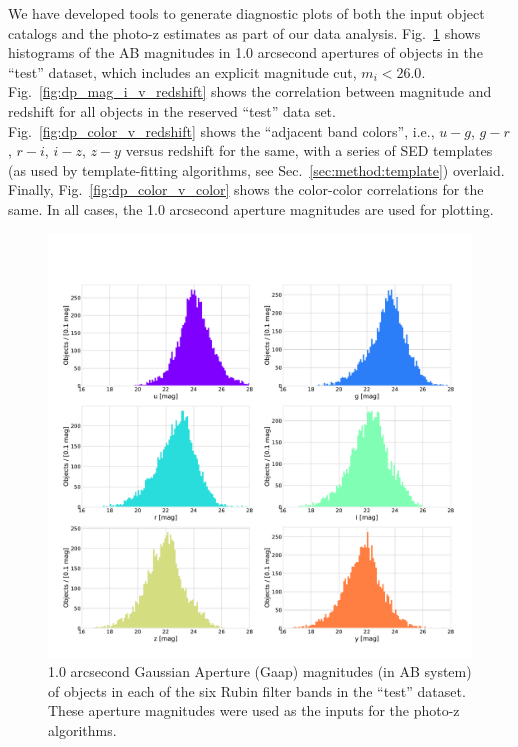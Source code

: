 We have developed tools to generate diagnostic plots of both the input object catalogs and the photo-z estimates as part of our data analysis.
Fig.~\ref{fig:dp_mags} shows histograms of the AB magnitudes in 1.0 arcsecond apertures of objects in the ``test'' dataset, which includes an explicit magnitude cut, $m_{i} < 26.0$.
Fig.~\ref{fig:dp_mag_i_v_redshift} shows the correlation between magnitude and redshift for all objects in the reserved ``test'' data set.  
Fig.~\ref{fig:dp_color_v_redshift} shows the ``adjacent band colors'', i.e., $u-g$, $g-r$, $r-i$, $i-z$, $z-y$ versus redshift for the same, with a series of SED templates (as used by template-fitting algorithms, see Sec.~\ref{sec:method:template}) overlaid.  
Finally, Fig.~\ref{fig:dp_color_v_color} shows the color-color correlations for the same.  In all cases, the 1.0 arcsecond aperture magnitudes are used for plotting.

\begin{figure}
    \centering
    \includegraphics[width=\linewidth]{figures/mags.pdf}
    \caption{1.0 arcsecond Gaussian Aperture (Gaap) magnitudes (in AB system) of objects in each of the six Rubin filter bands in the ``test'' dataset.  These aperture magnitudes were used as the inputs for the photo-z algorithms.}
    \label{fig:dp_mags}
\end{figure}

